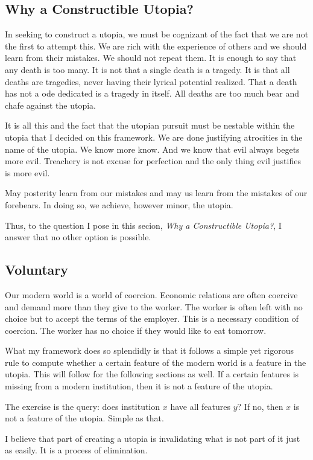 \documentclass[12pt]{article}
\begin{document}
\subsection{Why a Constructible Utopia?}
In seeking to construct a utopia, we must be cognizant of the fact that we are not the first to attempt this.
We are rich with the experience of others and we should learn from their mistakes.
We should not repeat them.
It is enough to say that any death is too many.
It is not that a single death is a tragedy.
It is that all deaths are tragedies, never having their lyrical potential realized.
That a death has not a ode dedicated is a tragedy in itself.
All deaths are too much bear and chafe against the utopia.

It is all this and the fact that the utopian pursuit must be nestable within the utopia that I decided on this framework.
We are done justifying atrocities in the name of the utopia.
We know more know.
And we know that evil always begets more evil.
Treachery is not excuse for perfection and the only thing evil justifies is more evil.

May posterity learn from our mistakes and may us learn from the mistakes of our forebears.
In doing so, we achieve, however minor, the utopia.

Thus, to the question I pose in this secion, \textit{Why a Constructible Utopia?}, I answer that no other option is possible.

\subsection{Voluntary}
Our modern world is a world of coercion.
Economic relations are often coercive and demand more than they give to the worker.
The worker is often left with no choice but to accept the terms of the employer.
This is a necessary condition of coercion.
The worker has no choice if they would like to eat tomorrow.

What my framework does so splendidly is that it follows a simple yet rigorous rule to compute whether a certain feature of the modern world is a feature in the utopia.
This will follow for the following sections as well.
If a certain features is missing from a modern institution, then it is not a feature of the utopia.

The exercise is the query: does institution $x$ have all features $y$?
If no, then $x$ is not a feature of the utopia.
Simple as that.

I believe that part of creating a utopia is invalidating what is not part of it just as easily.
It is a process of elimination.
\end{document}
